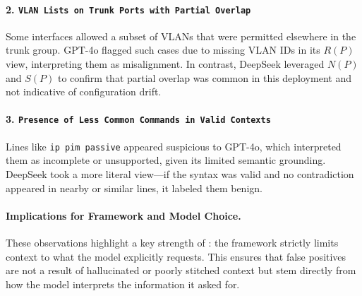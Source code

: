 \paragraph{2. \texttt{VLAN Lists on Trunk Ports with Partial Overlap}}  
Some interfaces allowed a subset of VLANs that were permitted elsewhere in the trunk group.  GPT-4o flagged such cases due to missing VLAN IDs in its $R(P)$ view,  interpreting them as misalignment. In contrast, DeepSeek leveraged $N(P)$ and $S(P)$ to confirm that partial overlap was common in this deployment and not indicative of configuration drift.

\paragraph{3. \texttt{Presence of Less Common Commands in Valid Contexts}}  
Lines like \texttt{ip pim passive} appeared suspicious to GPT-4o, which interpreted them as incomplete or unsupported, given its limited semantic grounding.  DeepSeek took a more literal view—if the syntax was valid and no contradiction appeared in nearby or similar lines, it labeled them benign.

\paragraph{Implications for Framework and Model Choice.}
These observations highlight a key strength of \sysname{}: the framework strictly limits context to what the model explicitly requests.  This ensures that false positives are not a result of hallucinated or poorly stitched context but stem directly from how the model interprets the information it asked for.

